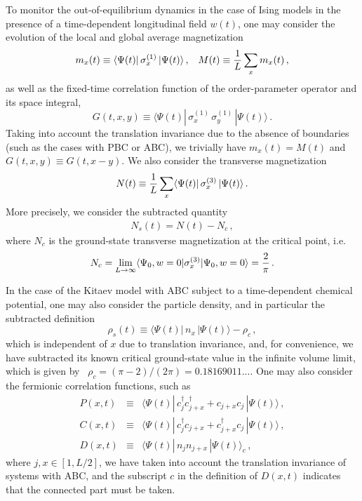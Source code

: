 To monitor the out-of-equilibrium dynamics in the case of Ising models
in the presence of a time-dependent longitudinal field $w(t)$, one may
consider the evolution of the local and global average magnetization
\begin{equation}
  m_x(t) \equiv \langle \Psi(t) | \, \sigma_x^{(1)} \, | \Psi(t)\rangle\,,
  \;\;\; M(t) \equiv {1\over L} \sum_x m_x(t)\,,
  \label{magnt}
\end{equation}
as well as the fixed-time correlation function of the order-parameter
operator and its space integral,
\begin{equation}
  G(t,x,y) \equiv \langle \Psi(t) | \,  \sigma_{x}^{(1)} \, 
  \sigma_{y}^{(1)}\,| \Psi(t)\rangle\,.
  \label{twopointt}
\end{equation}
Taking into account the translation invariance due to the absence of
boundaries (such as the cases with PBC or ABC), we trivially have
$m_x(t) = M(t)$ and $G(t,x,y) \equiv G(t,x-y)$.
We also consider the transverse magnetization 
\begin{equation}
N(t) \equiv {1\over L} \sum_x \langle \Psi(t) | \, \sigma_x^{(3)} \,
| \Psi(t)\rangle\,.
  \label{magntt}
\end{equation}
More precisely, we consider the subtracted quantity
\begin{eqnarray}
  N_s(t) = N(t) - N_c\,,\label{subdef}
\end{eqnarray}
where $N_c$ is the ground-state transverse magnetization at the
critical point, i.e.~\cite{PF70}
\begin{eqnarray}  
  N_c = \lim_{L\to\infty}
  \langle \Psi_0, w=0 | \sigma_x^{(3)} | \Psi_0, w=0\rangle =
  {2\over \pi}\,.\label{mzc}
 \end{eqnarray}

In the case of the Kitaev model with ABC subject to a time-dependent
chemical potential, one may also consider the particle density, and in
particular the subtracted definition
\begin{equation}
  \rho_s(t) \equiv \langle \Psi(t) | \,  n_x \, |
  \Psi(t)\rangle - \rho_c\,,
  \label{rhot}
\end{equation}
which is independent of $x$ due to translation invariance, and, for
convenience, we have subtracted its known critical ground-state value
in the infinite volume limit, which is given by~\cite{PF70}
$\rho_c = (\pi-2)/(2\pi)=0.18169011...$. One may also consider the
fermionic correlation functions, such as
\begin{eqnarray}
  P(x,t) &\equiv& \langle \Psi(t) | \, c_j^\dagger 
  c_{j+x}^\dagger + c_{j+x} c_{j} \, | \Psi(t)\rangle\, ,
  \label{eq:corr} \\
  C(x,t) & \equiv  &\langle \Psi(t) |
  \, c_j^\dagger c_{j+x} 
  + c_{j+x}^\dagger c_{j} \, | \Psi(t) \rangle \, ,
  \nonumber \\
  D(x,t)& \equiv &
  \langle \Psi(t) | \, n_j n_{j+x} \, |\Psi(t) \rangle_c \,, 
  \nonumber
\end{eqnarray}
where $j,x \in [1,L/2]$, we have taken into account the translation
invariance of systems with ABC, and the subscript $c$ in the definition
of $D(x,t)$ indicates that the connected part must be taken.


